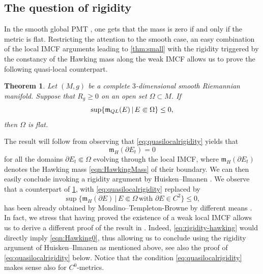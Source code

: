 \documentclass[a4paper,12pt,reqno]{amsart}
\numberwithin{equation}{section}
\theoremstyle{plain}
\newtheorem{theorem}{Theorem}[section]
\theoremstyle{definition}
\theoremstyle{remark}
\begin{document}
{\subsection{The question of rigidity} 
In the smooth global PMT \cite{SchoenYauPMT}, one gets that the mass is zero if and only if the metric is flat. Restricting the attention to the smooth case, an easy combination of the local IMCF arguments leading to \cref{thm:small} with the rigidity triggered by the constancy of the Hawking mass along the weak IMCF \cite{HuiskenIlmanen} allows us to prove the following quasi-local counterpart.  
\begin{theorem}
\label{thm:quasilocalrigidity}
Let $(M, g)$ be a complete $3$-dimensional smooth Riemannian manifold. Suppose that ${R}_g \geq 0$ on an open set $\Omega \subset M$. If
\begin{equation}
\label{eq:quasilocalrigidity}
\sup \{\mathfrak{m}_{\rm QL} (E) \, | \, E \Subset \Omega\} \leq 0,
\end{equation}
then $\Omega$ is flat.
\end{theorem}
The result will follow from observing that \eqref{eq:quasilocalrigidity} yields 
that 
\begin{equation}\label{eqn:Hawking0}
\mathfrak{m}_{H} (\partial E_t) = 0
\end{equation}
for all the domains $\partial E_t \Subset \Omega$ evolving through the local IMCF, where $\mathfrak{m}_{H} (\partial E_t)$ denotes the Hawking mass \eqref{eqn:HawkingMass} of their boundary. We can then easily conclude invoking a rigidity argument by Huisken--Ilmanen \cite{HuiskenIlmanen}.
We observe that a counterpart of \cref{thm:quasilocalrigidity}, with \eqref{eq:quasilocalrigidity} replaced by
\begin{equation}
\label{eq:rigidity-hawking}
    \sup \{\mathfrak{m}_{H} (\partial E) \, | \, E \Subset \Omega \, \text{with } \partial E \in C^2\}  \leq 0,
\end{equation}
has been already obtained by Mondino--Templeton-Browne by different means \cite{t.browne-mondino}. In fact, we stress that having proved the existence of a weak local IMCF allows us to derive a different proof of the result in \cite{t.browne-mondino}. Indeed, \eqref{eq:rigidity-hawking} would directly imply \eqref{eqn:Hawking0}, thus allowing us to conclude using the rigidity argument of Huisken--Ilmanen as mentioned above, see also the proof of \eqref{eq:quasilocalrigidity} below.
Notice that the condition \eqref{eq:quasilocalrigidity} makes sense also for $C^0$-metrics.

}
\end{document}
